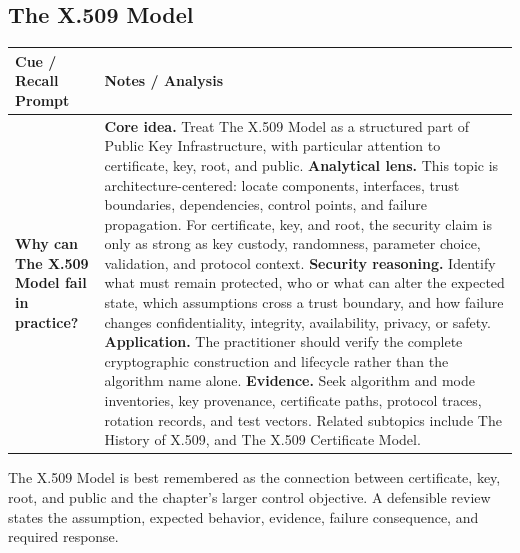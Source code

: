 \documentclass[11pt]{article}
\newcommand{\CornellHeader}{%
\rowcolor{Navy}\color{white}\bfseries Cue / Recall Prompt & \color{white}\bfseries Notes / Analysis\\\hline}
\newcommand{\CornellRow}[2]{%
\cellcolor{CueGray}\RaggedRight\textbf{#1} & \RaggedRight #2\\\hline}
\begin{document}
\subsection*{The X.509 Model}
\begin{longtable}{>{\RaggedRight\arraybackslash}p{}|>{\RaggedRight\arraybackslash}p{}}
\CornellHeader
\CornellRow{Why can The X.509 Model fail in practice?}{\textbf{Core idea.} Treat The X.509 Model as a structured part of Public Key Infrastructure, with particular attention to certificate, key, root, and public. \textbf{Analytical lens.} This topic is architecture-centered: locate components, interfaces, trust boundaries, dependencies, control points, and failure propagation. For certificate, key, and root, the security claim is only as strong as key custody, randomness, parameter choice, validation, and protocol context. \textbf{Security reasoning.} Identify what must remain protected, who or what can alter the expected state, which assumptions cross a trust boundary, and how failure changes confidentiality, integrity, availability, privacy, or safety. \textbf{Application.} The practitioner should verify the complete cryptographic construction and lifecycle rather than the algorithm name alone. \textbf{Evidence.} Seek algorithm and mode inventories, key provenance, certificate paths, protocol traces, rotation records, and test vectors. Related subtopics include The History of X.509, and The X.509 Certificate Model.}
\end{longtable}
\begin{topicsummary}
The X.509 Model is best remembered as the connection between certificate, key, root, and public and the chapter's larger control objective. A defensible review states the assumption, expected behavior, evidence, failure consequence, and required response.
\end{topicsummary}
\end{document}

